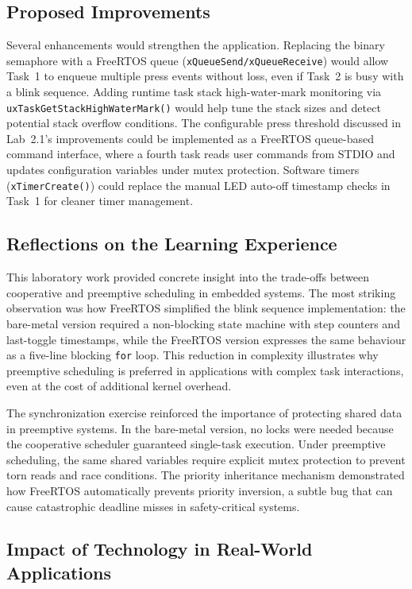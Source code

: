 \subsection{Proposed Improvements}

Several enhancements would strengthen the application. Replacing the binary semaphore with a FreeRTOS queue (\texttt{xQueueSend/xQueueReceive}) would allow Task~1 to enqueue multiple press events without loss, even if Task~2 is busy with a blink sequence. Adding runtime task stack high-water-mark monitoring via \texttt{uxTaskGetStackHighWaterMark()} would help tune the stack sizes and detect potential stack overflow conditions. The configurable press threshold discussed in Lab~2.1's improvements could be implemented as a FreeRTOS queue-based command interface, where a fourth task reads user commands from STDIO and updates configuration variables under mutex protection. Software timers (\texttt{xTimerCreate()}) could replace the manual LED auto-off timestamp checks in Task~1 for cleaner timer management.

\subsection{Reflections on the Learning Experience}

This laboratory work provided concrete insight into the trade-offs between cooperative and preemptive scheduling in embedded systems. The most striking observation was how FreeRTOS simplified the blink sequence implementation: the bare-metal version required a non-blocking state machine with step counters and last-toggle timestamps, while the FreeRTOS version expresses the same behaviour as a five-line blocking \texttt{for} loop. This reduction in complexity illustrates why preemptive scheduling is preferred in applications with complex task interactions, even at the cost of additional kernel overhead.

The synchronization exercise reinforced the importance of protecting shared data in preemptive systems. In the bare-metal version, no locks were needed because the cooperative scheduler guaranteed single-task execution. Under preemptive scheduling, the same shared variables require explicit mutex protection to prevent torn reads and race conditions. The priority inheritance mechanism demonstrated how FreeRTOS automatically prevents priority inversion, a subtle bug that can cause catastrophic deadline misses in safety-critical systems.

\subsection{Impact of Technology in Real-World Applications}


